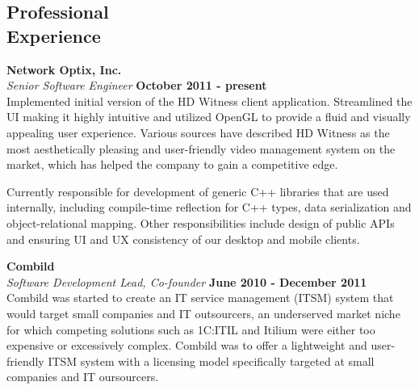 \documentclass[margin,line]{CV}
\begin{document}
\begin{resume}
    
    
    \section{\mysidestyle Professional\\Experience}
    \textbf{Network Optix, Inc.} \vspace{2mm}\\\vspace{1mm}%
    \textsl{Senior Software Engineer} \hfill \textbf{October 2011 - present}\\ 
	Implemented initial version of the HD Witness client application. Streamlined the UI making it highly intuitive and utilized OpenGL to provide a fluid and visually appealing user experience. Various sources have described HD Witness as the most aesthetically pleasing and user-friendly video management system on the market, which has helped the company to gain a competitive edge.
    
    Currently responsible for development of generic C++ libraries that are used internally, including compile-time reflection for C++ types, data serialization and object-relational mapping. Other responsibilities include design of public APIs and ensuring UI and UX consistency of our desktop and mobile clients.

    
	\textbf{Combild} \vspace{2mm}\\\vspace{1mm}%
	\textsl{Software Development Lead, Co-founder} \hfill \textbf{June 2010 - December 2011}\\	
	Combild was started to create an IT service management (ITSM) system that would target small companies and IT outsourcers, an underserved market niche for which competing solutions such as 1C:ITIL and Itilium were either too expensive or excessively complex. Combild was to offer a lightweight and user-friendly ITSM system with a licensing model specifically targeted at small companies and IT oursourcers.

	

\end{resume}
\end{document}

